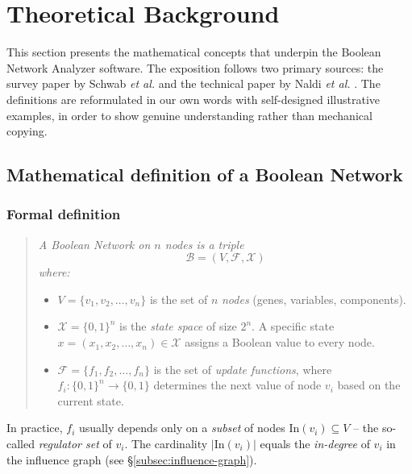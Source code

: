 \documentclass[oneside,final]{hcmut-report}
\begin{document}
\section{Theoretical Background}\label{sec:theory}

This section presents the mathematical concepts that underpin the Boolean Network Analyzer software. The exposition follows two primary sources: the survey paper by Schwab \emph{et al.} \cite{schwab2020} and the technical paper by Naldi \emph{et al.} \cite{naldi2009}. The definitions are reformulated in our own words with self-designed illustrative examples, in order to show genuine understanding rather than mechanical copying.

\subsection{Mathematical definition of a Boolean Network}\label{subsec:def-bn}

\subsubsection{Formal definition}

\begin{quote}
\textit{A Boolean Network on $n$ nodes is a triple}
$$\mathcal{B} = (V, \mathcal{F}, \mathcal{X})$$
\textit{where:}
\begin{itemize}[leftmargin=*]
    \item $V = \{v_1, v_2, \ldots, v_n\}$ is the set of $n$ \textit{nodes} (genes, variables, components).
    \item $\mathcal{X} = \{0, 1\}^n$ is the \textit{state space} of size $2^n$. A specific state $x = (x_1, x_2, \ldots, x_n) \in \mathcal{X}$ assigns a Boolean value to every node.
    \item $\mathcal{F} = \{f_1, f_2, \ldots, f_n\}$ is the set of \textit{update functions}, where $f_i : \{0,1\}^n \to \{0,1\}$ determines the next value of node $v_i$ based on the current state.
\end{itemize}
\end{quote}

In practice, $f_i$ usually depends only on a \textit{subset} of nodes $\mathrm{In}(v_i) \subseteq V$ -- the so-called \textit{regulator set} of $v_i$. The cardinality $|\mathrm{In}(v_i)|$ equals the \textit{in-degree} of $v_i$ in the influence graph (see \S\ref{subsec:influence-graph}).
\end{document}
